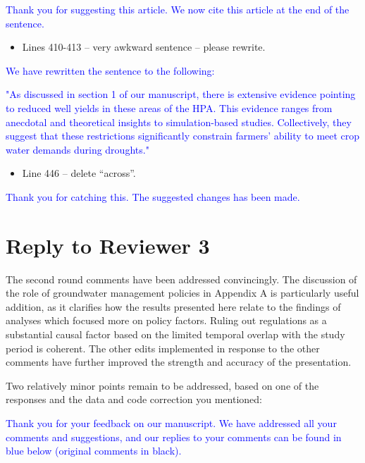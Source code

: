 \documentclass[
]{article}
\providecommand{\tightlist}{%
  \setlength{\itemsep}{0pt}\setlength{\parskip}{0pt}}
\begin{document}
\textcolor{blue}{Thank you for suggesting this article. We now cite this article at the end of the sentence.}

\begin{itemize}
\tightlist
\item
  Lines 410-413 -- very awkward sentence -- please rewrite.
\end{itemize}

\textcolor{blue}{We have rewritten the sentence to the following:}

\textcolor{blue}{"As discussed in section 1 of our manuscript, there is extensive evidence pointing to reduced well yields in these areas of the HPA. This evidence ranges from anecdotal and theoretical insights to simulation-based studies. Collectively, they suggest that these restrictions significantly constrain farmers' ability to meet crop water demands during droughts."}

\begin{itemize}
\tightlist
\item
  Line 446 -- delete ``across''.
\end{itemize}

\textcolor{blue}{Thank you for catching this. The suggested changes has been made.}

\hypertarget{reply-to-reviewer-3}{%
\section{Reply to Reviewer 3}\label{reply-to-reviewer-3}}

The second round comments have been addressed convincingly. The
discussion of the role of groundwater management policies in Appendix A
is particularly useful addition, as it clarifies how the results
presented here relate to the findings of analyses which focused more on
policy factors. Ruling out regulations as a substantial causal factor
based on the limited temporal overlap with the study period is coherent.
The other edits implemented in response to the other comments have
further improved the strength and accuracy of the presentation.

Two relatively minor points remain to be addressed, based on one of the
responses and the data and code correction you mentioned:

\textcolor{blue}{Thank you for your feedback on our manuscript. We have addressed all your comments and suggestions, and our replies to your comments can be found in blue below (original comments in black).}
\end{document}
